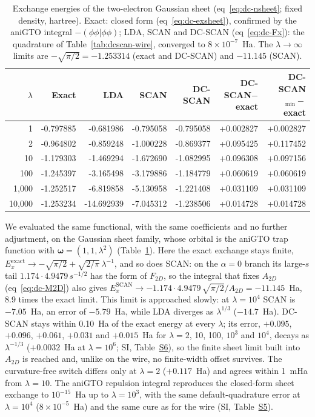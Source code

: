 \documentclass[journal=jctcce,manuscript=article]{achemso}
\begin{document}
\begin{table}[H]
\centering
\caption{Exchange energies of the two-electron Gaussian sheet
  (eq~\ref{eq:dc-nsheet}; fixed density, hartree).  Exact: closed form
  (eq~\ref{eq:dc-exsheet}), confirmed by the aniGTO integral
  $-(\phi\phi|\phi\phi)$; LDA, SCAN and DC-SCAN (eq~\ref{eq:dc-Fx}): the
  quadrature of Table~\ref{tab:dcscan-wire}, converged to
  $8\times10^{-7}$~Ha.  The $\lambda\to\infty$ limits are
  $-\sqrt{\pi/2}=-1.253314$ (exact and DC-SCAN) and $-11.145$ (SCAN).}
\label{tab:dcscan-sheet}
\scriptsize
\begin{tabular}{@{}rrrrrrr@{}}
\toprule
$\lambda$ & Exact & LDA & SCAN & DC-SCAN & DC-SCAN$-$exact & DC-SCAN$_{\min}-$exact \\
\midrule
1 & -0.797885 & -0.681986 & -0.795058 & -0.795058 & +0.002827 & +0.002827 \\
2 & -0.964802 & -0.859248 & -1.000228 & -0.869377 & +0.095425 & +0.117452 \\
10 & -1.179303 & -1.469294 & -1.672690 & -1.082995 & +0.096308 & +0.097156 \\
100 & -1.245397 & -3.165498 & -3.179886 & -1.184779 & +0.060619 & +0.060619 \\
1,000 & -1.252517 & -6.819858 & -5.130958 & -1.221408 & +0.031109 & +0.031109 \\
10,000 & -1.253234 & -14.692939 & -7.045312 & -1.238506 & +0.014728 & +0.014728 \\
\bottomrule
\end{tabular}

\end{table}

We evaluated the same functional, with the same coefficients and no further
adjustment, on the Gaussian sheet family, whose orbital is the aniGTO trap
function with $\boldsymbol\omega=(1,1,\lambda^2)$
(Table~\ref{tab:dcscan-sheet}).  Here the exact exchange stays finite,
$E_x^{\mathrm{exact}}\to-\sqrt{\pi/2}+\sqrt{2/\pi}\,\lambda^{-1}$, and so does
SCAN: on the $\alpha=0$ branch its large-$s$ tail $1.174\cdot4.9479\,s^{-1/2}$
has the form of $F_{2D}$, so the integral that fixes $A_{2D}$
(eq~\ref{eq:dc-M2D}) also gives
$E_x^{\mathrm{SCAN}}\to-1.174\cdot4.9479\,\sqrt{\pi/2}/A_{2D}=-11.145$~Ha,
8.9 times the exact limit.  This limit is approached slowly: at
$\lambda=10^4$ SCAN is $-7.05$~Ha, an error of $-5.79$~Ha, while LDA diverges
as $\lambda^{1/3}$ ($-14.7$~Ha).  DC-SCAN stays within 0.10~Ha of the exact
energy at every $\lambda$; its error, $+0.095$, $+0.096$, $+0.061$, $+0.031$
and $+0.015$~Ha for $\lambda=2$, 10, 100, $10^3$ and $10^4$, decays as
$\lambda^{-1/3}$ ($+0.0032$~Ha at $\lambda=10^6$; SI,
Table~\href{si.pdf\#table.6}{S6}), so the finite sheet limit built into
$A_{2D}$ is reached and, unlike on the wire, no finite-width offset survives.
The curvature-free switch differs only at $\lambda=2$ ($+0.117$~Ha) and agrees
within 1~mHa from $\lambda=10$.  The aniGTO repulsion integral reproduces the
closed-form sheet exchange to $10^{-15}$~Ha up to $\lambda=10^3$, with the
same default-quadrature error at $\lambda=10^4$ ($8\times10^{-5}$~Ha) and the
same cure as for the wire (SI, Table~\href{si.pdf\#table.5}{S5}).
\end{document}
